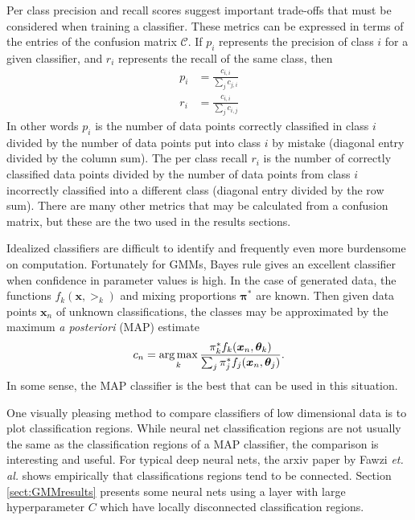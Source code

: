 Per class precision and recall scores suggest important trade-offs that must be considered when training a classifier. These metrics can be expressed in terms of the entries of the confusion matrix \( \mathcal{C} \). If \( p_i \) represents the precision of class \( i \) for a given classifier, and \( r_i \) represents the recall of the same class, then 
\begin{align}
p_i &= \frac{c_{i,i}}{\sum_{j} c_{j,i}}\\
r_i &= \frac{c_{i,i}}{\sum_{j} c_{i,j}}
\end{align}
In other words \( p_i \) is the number of data points correctly classified in class \( i \) divided by the number of data points put into class \( i \) by mistake (diagonal entry divided by the column sum). The per class recall \( r_i \) is the number of correctly classified data points divided by the number of data points from class \( i \) incorrectly classified into a different class (diagonal entry divided by the row sum).  There are many other metrics that may be calculated from a confusion matrix, but these are the two used in the results sections.

Idealized classifiers are difficult to identify and frequently even more burdensome on computation.  Fortunately for GMMs, Bayes rule gives an excellent classifier when confidence in parameter values is high. In the case of generated data, the functions \( f_k(\bm x,\bm\gt_k) \) and mixing proportions \( \bm\pi^{\ast} \) are known. Then given data points \( \bm x_n \) of unknown classifications, the classes may be approximated by the maximum \textit{a posteriori} (MAP) estimate
\begin{equation}\label{eqn:MAPestimator}
c_n = \operatorname*{arg\,max}_k \frac{\pi_k^{\ast}f_k(\bm x_n,\bm{\theta}_k)}{\sum_j \pi_j^{\ast}f_j(\bm x_n,\bm{\theta}_j)}. 
\end{equation}
In some sense, the MAP classifier is the best that can be used in this situation.

One visually pleasing method to compare classifiers of low dimensional data is to plot classification regions. While neural net classification regions are not usually the same as the classification regions of a MAP classifier, the comparison is interesting and useful. For typical deep neural nets, the arxiv paper by Fawzi \textit{et. al.} \cite{fawzi2017classification} shows empirically that classifications regions tend to be connected.  Section \ref{sect:GMMresults} presents some neural nets using a \RS layer with large hyperparameter \( C \) which have locally disconnected classification regions.

